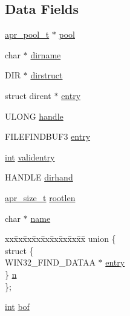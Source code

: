 \subsection*{Data Fields}
\begin{DoxyCompactItemize}
\item 
\hyperlink{structapr__pool__t}{apr\+\_\+pool\+\_\+t} $\ast$ \hyperlink{structapr__dir__t_a3cb1521d8e75d392e708934f9c6fd178}{pool}
\item 
char $\ast$ \hyperlink{structapr__dir__t_a18ca7f45c18219d94b1e500c70301cbb}{dirname}
\item 
D\+IR $\ast$ \hyperlink{structapr__dir__t_ab9a95626319c43bf881fef29494d4210}{dirstruct}
\item 
struct dirent $\ast$ \hyperlink{structapr__dir__t_a3ca708a80f894cffc347ee35a5055d8c}{entry}
\item 
U\+L\+O\+NG \hyperlink{structapr__dir__t_acfd3c206f3a37f9755d2fc02c6e025e7}{handle}
\item 
F\+I\+L\+E\+F\+I\+N\+D\+B\+U\+F3 \hyperlink{structapr__dir__t_a468405126fb08d5880ec676d41c01b36}{entry}
\item 
\hyperlink{pcre_8txt_a42dfa4ff673c82d8efe7144098fbc198}{int} \hyperlink{structapr__dir__t_a66d28636c6bf3b54be03ad229230f4a7}{validentry}
\item 
H\+A\+N\+D\+LE \hyperlink{structapr__dir__t_a89914216181b3734d90fe2d4cf513524}{dirhand}
\item 
\hyperlink{group__apr__platform_gaaa72b2253f6f3032cefea5712a27540e}{apr\+\_\+size\+\_\+t} \hyperlink{structapr__dir__t_a97d647b007059676624eb23b3805fc6a}{rootlen}
\item 
char $\ast$ \hyperlink{structapr__dir__t_a32bbf12a97448197d0a3b3b20455493b}{name}
\item 
\begin{tabbing}
xx\=xx\=xx\=xx\=xx\=xx\=xx\=xx\=xx\=\kill
union \{\\
\>struct \{\\
\>\>WIN32\_FIND\_DATAA $\ast$ \hyperlink{structapr__dir__t_a87ba764106b1c690635ea040da277242}{entry}\\
\>\} \hyperlink{structapr__dir__t_a7b68beaa0b0d3d709b7bd6686edf1dc2}{n}\\
\}; \\

\end{tabbing}\item 
\hyperlink{pcre_8txt_a42dfa4ff673c82d8efe7144098fbc198}{int} \hyperlink{structapr__dir__t_ac5b544b98e43e25420377d322b49e67c}{bof}
\end{DoxyCompactItemize}


